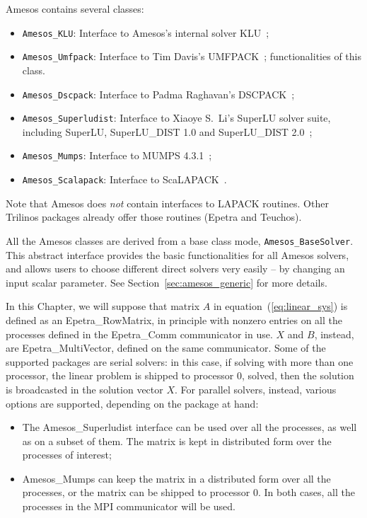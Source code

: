 Amesos contains several classes: 
\begin{itemize}
\item \verb!Amesos_KLU!: Interface to Amesos's internal solver
  KLU~\cite{KLU};
\item \verb!Amesos_Umfpack!: Interface to Tim Davis's
  UMFPACK~\cite{umfpack-home-page};
  functionalities of this class.
\item \verb!Amesos_Dscpack!: Interface to Padma Raghavan's
  DSCPACK~\cite{dscpack-home-page};
\item \verb!Amesos_Superludist!: Interface to Xiaoye S.~Li's SuperLU
  solver suite, including SuperLU, SuperLU\_DIST 1.0 and SuperLU\_DIST
  2.0~\cite{superlu-home-page};
\item \verb!Amesos_Mumps!: Interface to MUMPS 4.3.1~\cite{mumps-home-page};
\item \verb!Amesos_Scalapack!: Interface to ScaLAPACK~\cite{scalapack}.
\end{itemize}


Note that Amesos does {\sl not} contain interfaces to LAPACK routines.
Other Trilinos packages already offer those routines (Epetra and
Teuchos).

All the Amesos classes are derived from a base class mode,
\verb!Amesos_BaseSolver!. This abstract interface provides the basic
functionalities for all Amesos solvers, and allows users to choose
different direct solvers very easily -- by changing an input scalar
parameter. See Section~\ref{sec:amesos_generic} for more details.

In this Chapter, we will suppose that matrix $A$ in
equation~(\ref{eq:linear_sys}) is defined as an Epetra\_RowMatrix, in
principle with nonzero entries on all the processes defined in the
Epetra\_Comm communicator in use. $X$ and $B$, instead, are
Epetra\_MultiVector, defined on the same communicator.  Some of the
supported packages are serial solvers: in this case, if solving with
more than one processor, the linear problem is shipped to processor 0,
solved, then the solution is broadcasted in the solution vector $X$. For
parallel solvers, instead, various options are supported, depending on
the package at hand:
\begin{itemize}
\item The Amesos\_Superludist interface can be used over all the
  processes, as well as on a subset of them. The matrix is kept in
  distributed form over the processes of interest;
\item Amesos\_Mumps can keep the matrix in a distributed form over all
  the processes, or the matrix can be shipped to processor 0. In both
  cases, all the processes in the MPI communicator will be used.
\end{itemize}

